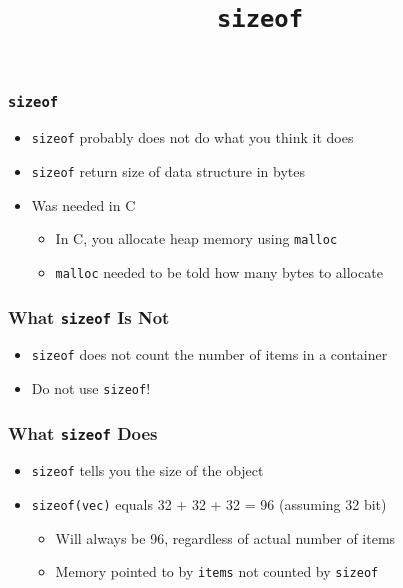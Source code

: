 
\usetikzlibrary{shadows,shapes.multipart}

\title{\texttt{sizeof}}





\begin{frame}
  \titlepage
\end{frame}

\begin{frame}
  \frametitle{\texttt{sizeof}}
  \begin{itemize}
    \item \texttt{sizeof} probably does not do what you think it does
    \item \texttt{sizeof} return size of data structure in bytes
    \item Was needed in C
          \begin{itemize}
            \item In C, you allocate heap memory using \texttt{malloc}
            \item \texttt{malloc} needed to be told how many bytes to allocate
          \end{itemize}
  \end{itemize}
\end{frame}

\begin{frame}
  \frametitle{What \texttt{sizeof} Is Not}
  \begin{itemize}
    \item \texttt{sizeof} does not count the number of items in a container
    \item Do not use \texttt{sizeof}!
  \end{itemize}
\end{frame}

\begin{frame}
  \frametitle{What \texttt{sizeof} Does}
  \begin{itemize}
    \item \texttt{sizeof} tells you the size of the object
    \item \texttt{sizeof(vec)} equals 32 + 32 + 32 = 96 (assuming 32 bit)
          \begin{itemize}
            \item Will always be 96, regardless of actual number of items
            \item Memory pointed to by \texttt{items} not counted by \texttt{sizeof}
          \end{itemize}
  \end{itemize}
\end{frame}

